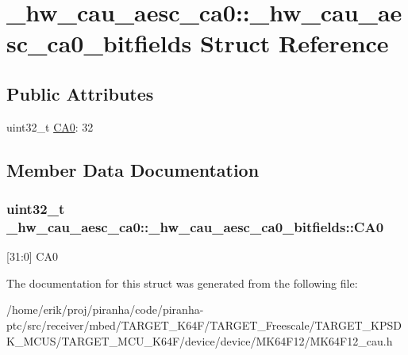 \hypertarget{struct__hw__cau__aesc__ca0_1_1__hw__cau__aesc__ca0__bitfields}{}\section{\+\_\+hw\+\_\+cau\+\_\+aesc\+\_\+ca0\+:\+:\+\_\+hw\+\_\+cau\+\_\+aesc\+\_\+ca0\+\_\+bitfields Struct Reference}
\label{struct__hw__cau__aesc__ca0_1_1__hw__cau__aesc__ca0__bitfields}
\subsection*{Public Attributes}
\begin{DoxyCompactItemize}
\item 
uint32\+\_\+t \hyperlink{struct__hw__cau__aesc__ca0_1_1__hw__cau__aesc__ca0__bitfields_a7c8733076e0b5c7cf9f3ba7a67ed140c}{C\+A0}\+: 32
\end{DoxyCompactItemize}


\subsection{Member Data Documentation}
\subsubsection[{\texorpdfstring{C\+A0}{CA0}}]{\setlength{\rightskip}{0pt plus 5cm}uint32\+\_\+t \+\_\+hw\+\_\+cau\+\_\+aesc\+\_\+ca0\+::\+\_\+hw\+\_\+cau\+\_\+aesc\+\_\+ca0\+\_\+bitfields\+::\+C\+A0}\hypertarget{struct__hw__cau__aesc__ca0_1_1__hw__cau__aesc__ca0__bitfields_a7c8733076e0b5c7cf9f3ba7a67ed140c}{}\label{struct__hw__cau__aesc__ca0_1_1__hw__cau__aesc__ca0__bitfields_a7c8733076e0b5c7cf9f3ba7a67ed140c}
\mbox{[}31\+:0\mbox{]} C\+A0 

The documentation for this struct was generated from the following file\+:\begin{DoxyCompactItemize}
\item 
/home/erik/proj/piranha/code/piranha-\/ptc/src/receiver/mbed/\+T\+A\+R\+G\+E\+T\+\_\+\+K64\+F/\+T\+A\+R\+G\+E\+T\+\_\+\+Freescale/\+T\+A\+R\+G\+E\+T\+\_\+\+K\+P\+S\+D\+K\+\_\+\+M\+C\+U\+S/\+T\+A\+R\+G\+E\+T\+\_\+\+M\+C\+U\+\_\+\+K64\+F/device/device/\+M\+K64\+F12/M\+K64\+F12\+\_\+cau.\+h\end{DoxyCompactItemize}
